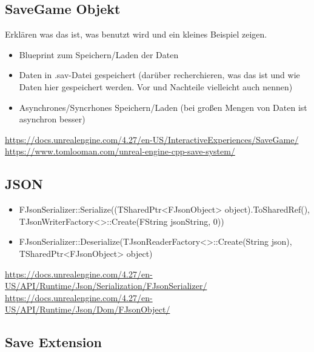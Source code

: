 \subsection{SaveGame Objekt}
Erklären was das ist, was benutzt wird und ein kleines Beispiel zeigen.

\begin{itemize}
    \item Blueprint zum Speichern/Laden der Daten
    \item Daten in .sav-Datei gespeichert (darüber recherchieren, was das ist und wie Daten hier gespeichert werden. Vor und Nachteile vielleicht auch nennen)
    \item Asynchrones/Syncrhones Speichern/Laden (bei großen Mengen von Daten ist asynchron besser)
\end{itemize}

\url{https://docs.unrealengine.com/4.27/en-US/InteractiveExperiences/SaveGame/}\\
\url{https://www.tomlooman.com/unreal-engine-cpp-save-system/}

\subsection{JSON}

\begin{itemize}
    \item FJsonSerializer::Serialize((TSharedPtr<FJsonObject> object).ToSharedRef(), TJsonWriterFactory<>::Create(FString jsonString, 0))
    \item FJsonSerializer::Deserialize(TJsonReaderFactory<>::Create(String json), TSharedPtr<FJsonObject> object)
\end{itemize}
\url{https://docs.unrealengine.com/4.27/en-US/API/Runtime/Json/Serialization/FJsonSerializer/}\\
\url{https://docs.unrealengine.com/4.27/en-US/API/Runtime/Json/Dom/FJsonObject/}

\subsection{Save Extension}

